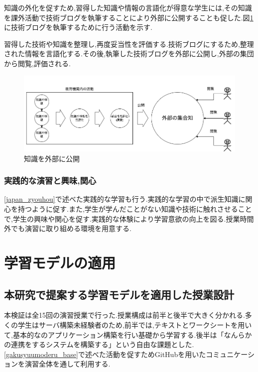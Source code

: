 \documentclass[11pt, a4paper]{jreport}
\begin{document}
知識の外化を促すため,習得した知識や情報の言語化が得意な学生には,その知識を課外活動で技術ブログを執筆することにより外部に公開することも促した.図\ref{fig:chisikiout}に技術ブログを執筆するために行う活動を示す.

習得した技術や知識を整理し,再度妥当性を評価する.技術ブログにするため,整理された情報を言語化する.その後,執筆した技術ブログを外部に公開し,外部の集団から閲覧,評価される.

\begin{figure}[H]
\begin{center}
\includegraphics[width=120mm]{./img/gaibunikoukai.png}
\caption{知識を外部に公開}
\label{fig:chisikiout}
\end{center}
\end{figure}

\subsection{実践的な演習と興味,関心}\label{zissenn_kyoumi}

\ref{japan_zyouhou}で述べた実践的な学習も行う.実践的な学習の中で派生知識に関心を持つように促す.また,学生が学んだことがない知識や技術に触れさせることで,学生の興味や関心を促す.実践的な体験により学習意欲の向上を図る.授業時間外でも演習に取り組める環境を用意する.

\chapter{学習モデルの適用}

\section{本研究で提案する学習モデルを適用した授業設計}

本検証は全15回の演習授業で行った.授業構成は前半と後半で大きく分かれる.多くの学生はサーバ構築未経験者のため,前半では,テキストとワークシートを用いて,基本的なのアプリケーション構築を行い基礎から学習する.後半は「なんらかの連携をするシステムを構築する」という自由な課題とした.\ref{gakusyuumoderu_base}で述べた活動を促すためGitHubを用いたコミュニケーションを演習全体を通して利用する.
\end{document}
